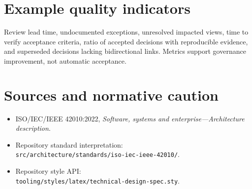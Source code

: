 \documentclass[11pt,letterpaper]{article}
\begin{document}
\section{Example quality indicators}
Review lead time, undocumented exceptions, unresolved impacted views,
time to verify acceptance criteria, ratio of accepted decisions with
reproducible evidence, and superseded decisions lacking bidirectional
links. Metrics support governance improvement, not automatic acceptance.

\section{Sources and normative caution}
\begin{itemize}
\item ISO/IEC/IEEE 42010:2022, \emph{Software, systems and enterprise---Architecture description}.
\item Repository standard interpretation: \\ \texttt{src/architecture/standards/iso-iec-ieee-42010/}.
\item Repository style API: \\ \texttt{tooling/styles/latex/technical-design-spec.sty}.
\end{itemize}
\end{document}
